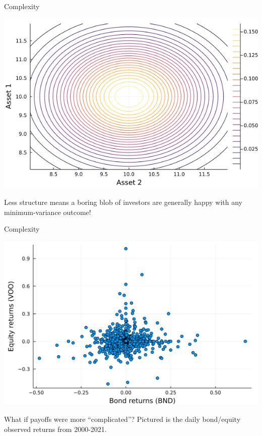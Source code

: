 \documentclass[
  ignorenonframetext,
]{beamer}
\begin{document}
\begin{frame}{Complexity}
\protect\hypertarget{complexity-3}{}
\begin{center}\includegraphics[width=0.9\paperheight]{complexity_files/figure-beamer/unnamed-chunk-4-1} \end{center}

Less structure means a boring blob of investors are generally happy with
any minimum-variance outcome!
\end{frame}

\begin{frame}{Complexity}
\protect\hypertarget{complexity-4}{}
\begin{center}\includegraphics[width=0.9\paperheight]{complexity_files/figure-beamer/unnamed-chunk-5-1} \end{center}

What if payoffs were more ``complicated''? Pictured is the daily
bond/equity observed returns from 2000-2021.
\end{frame}
\end{document}
